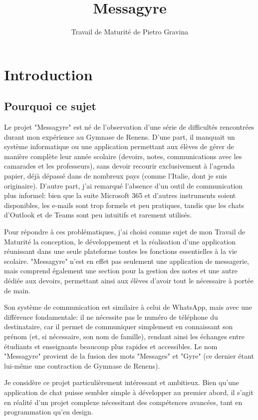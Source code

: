 \documentclass[12pt]{report}
\title{Messagyre}
\author{Travail de Maturité de Pietro Gravina}
\begin{document}
\maketitle

\chapter{Introduction}

\section{Pourquoi ce sujet}

Le projet "Messagyre" est né de l’observation d’une série de difficultés rencontrées durant mon expérience au Gymnase de Renens. D’une part, il manquait un système informatique ou une application permettant aux élèves de gérer de manière complète leur année scolaire (devoirs, notes, communications avec les camarades et les professeurs), sans devoir recourir exclusivement à l’agenda papier, déjà dépassé dans de nombreux pays (comme l’Italie, dont je suis originaire). D’autre part, j’ai remarqué l’absence d’un outil de communication plus informel: bien que la suite Microsoft 365 et d’autres instruments soient disponibles, les e-mails sont trop formels et peu pratiques, tandis que les chats d’Outlook et de Teams\supercite{teams} sont peu intuitifs et rarement utilisés.

Pour répondre à ces problématiques, j’ai choisi comme sujet de mon Travail de Maturité la conception, le développement et la réalisation d’une application réunissant dans une seule plateforme toutes les fonctions essentielles à la vie scolaire. "Messagyre" n’est en effet pas seulement une application de messagerie, mais comprend également une section pour la gestion des notes et une autre dédiée aux devoirs, permettant ainsi aux élèves d’avoir tout le nécessaire à portée de main.

Son système de communication est similaire à celui de WhatsApp\supercite{whatsapp}, mais avec une différence fondamentale: il ne nécessite pas le numéro de téléphone du destinataire, car il permet de communiquer simplement en connaissant son prénom (et, si nécessaire, son nom de famille), rendant ainsi les échanges entre étudiants et enseignants beaucoup plus rapides et accessibles. Le nom "Messagyre" provient de la fusion des mots "Messages" et "Gyre" (ce dernier étant lui-même une contraction de Gymnase de Renens).

Je considère ce projet particulièrement intéressant et ambitieux. Bien qu’une application de chat puisse sembler simple à développer au premier abord, il s’agit en réalité d’un projet complexe nécessitant des compétences avancées, tant en programmation qu’en design.
\end{document}
